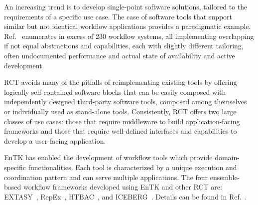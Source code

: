 \documentclass[preprint,12pt, a4paper]{elsarticle}
\begin{document}


An increasing trend is to develop single-point software solutions, tailored to
the requirements of a specific use case. The case of software tools that support
similar but not identical workflow applications provides a paradigmatic example.
Ref.~\cite{workflow-systems-url} enumerates in excess of 230 workflow systems,
all implementing overlapping if not equal abstractions and capabilities, each
with slightly different tailoring, often undocumented performance and actual
state of availability and active development.

RCT avoids many of the pitfalls of reimplementing existing tools by offering
logically self-contained software blocks that can be easily composed with
independently designed third-party software tools, composed among themselves or
individually used as stand-alone tools. Consistently, RCT offers two large
classes of use cases: those that require middleware to build application-facing
frameworks and those that require well-defined interfaces and capabilities to
develop a user-facing application.


EnTK has enabled the development of workflow tools which provide domain-specific
functionalities. Each tool is characterized by a unique execution and
coordination pattern and can serve multiple applications. The four
ensemble-based workflow frameworks developed using EnTK and other RCT are:
EXTASY~\cite{balasubramanian2016extasy}, RepEx~\cite{treikalis2016repex},
HTBAC~\cite{dakka2018high}, and ICEBERG~\cite{iceberg_paper}. Details can be
found in Ref.~\citep{turilli2019middleware}.

\end{document}
